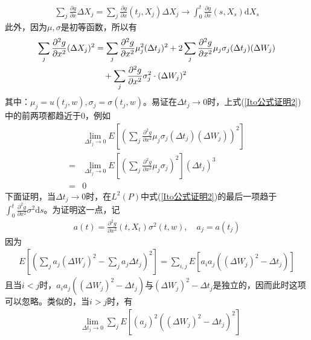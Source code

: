 \begin{Proof}
\begin{align*}
                    \sum_j \frac{\partial g}{\partial x}\Delta X_j = \sum_j \frac{\partial g}{\partial x}(t_j,X_j)\Delta X_j \rightarrow \int_0^t\frac{\partial g}{\partial x}(s,X_s) \mathrm{d}X_s
                \end{align*}
                此外，因为$\mu,\sigma$是初等函数，所以有
                \begin{align}
                    \label{Ito公式证明2}
                    \sum_j \frac{\partial^2 g}{\partial x^2}(\Delta X_j)^2 &= \sum_j\frac{\partial^2 g}{\partial x^2}\mu_j^2(\Delta t_j)^2 + 2\sum_j \frac{\partial ^2 g}{\partial x^2} \mu_j\sigma_j(\Delta t_j)(\Delta W_j) \notag\\
                    & \quad + \sum_j \frac{\partial ^2g}{\partial x^2} \sigma_j^2 \cdot (\Delta W_j)^2
                \end{align}
                其中：$\mu_j = u(t_j,w),\sigma_j = \sigma(t_j,w)$。易证在$\Delta t_j \rightarrow 0$时，上式(\ref{Ito公式证明2})中的前两项都趋近于$0$，例如
                \begin{align*}
                    &\lim_{\Delta t_j \rightarrow 0} E \left[ \left( \sum_j \frac{\partial ^2 g}{\partial x^2} \mu_j\sigma_j(\Delta t_j)(\Delta W_j) \right) ^2\right] \\
                    ={}& \lim_{\Delta t_j \rightarrow 0} E \left[ \left( \sum_j \frac{\partial ^2 g}{\partial x^2} \mu_j\sigma_j \right) ^2\right](\Delta t_j)^3 \\
                    ={}& 0
                \end{align*}
                下面证明，当$\Delta t_j \rightarrow 0$时，在$L^2(P)$中式(\ref{Ito公式证明2})的最后一项趋于$\int_0^t\frac{\partial^2g}{\partial x^2}\sigma^2\mathrm{d}s$。为证明这一点，记
                \begin{align*}
                a(t) = \frac{\partial^2g}{\partial x^2}(t,X_t)\sigma^2(t,w),\quad a_j = a(t_j)
                \end{align*}
                因为
                \begin{align*}
                    E\left[ \left( \sum_j a_j(\Delta W_j)^2 - \sum_ja_j\Delta t_j\right)^2 \right] = \sum_{i,j}E[a_ia_j((\Delta W_j)^2 - \Delta t_j)]
                \end{align*}
                且当$i<j$时，$a_ia_j((\Delta W_j)^2 - \Delta t_j)$与$(\Delta W_j)^2 - \Delta t_j$是独立的，因而此时这项可以忽略。类似的，当$i>j$时，有
                \begin{align*}
                    &\lim_{\Delta t_j \rightarrow 0} \sum_jE [(a_j)^2((\Delta W_j)^2 - \Delta t_j)^2]\\

\end{align*}
\end{Proof}

